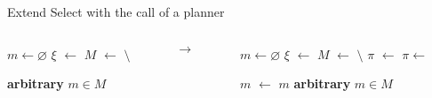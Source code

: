 \begin{frame}[fragile]{Extend Select with the call of a planner}
    \begin{columns}[c]
        \begin{column}{0.4\textwidth}
            \begin{algorithm}[H]
                \begin{algorithmic}
                    \scriptsize
                    \State $m \gets \varnothing$
                    \State $\xi$ $\gets$ 
                    \State $M$ $\gets$  $\setminus$ 
                    
                    \State \Return \textbf{arbitrary} $m \in M$ \label{line:return-failure}
                    
                    \EndFunction
              
                \end{algorithmic}
                \caption{Greedy select for a task $\tau$.}
                \label{alg:plan}
              \end{algorithm}
        \end{column}
        \begin{column}[c]{0.1\textwidth}
            \centering
            $\rightarrow$
        \end{column}
        
        \begin{column}{0.55\textwidth}
            
            \begin{algorithm}[H]
                \begin{algorithmic}
                    \scriptsize
                    \State $m \gets \varnothing$
                    \State $\xi$ $\gets$ 
                    \State $M$ $\gets$  $\setminus$ 
                    \State $\pi$ $\gets$  \label{line:get-parent-plan}
                     \label{line:check-valid}
                      \State $\pi \gets$  \label{line:call-planner}
                      
                    \EndIf
                    \State $m$ $\gets$  \label{line:get-method}
                      \State \Return $m$ \label{line:return-success}
                    \Else
                      \State \Return \textbf{arbitrary} $m \in M$ \label{line:return-failure}
                    \EndIf
                    \EndFunction
              

\end{algorithmic}
\end{algorithm}
\end{column}
\end{columns}
\end{frame}
